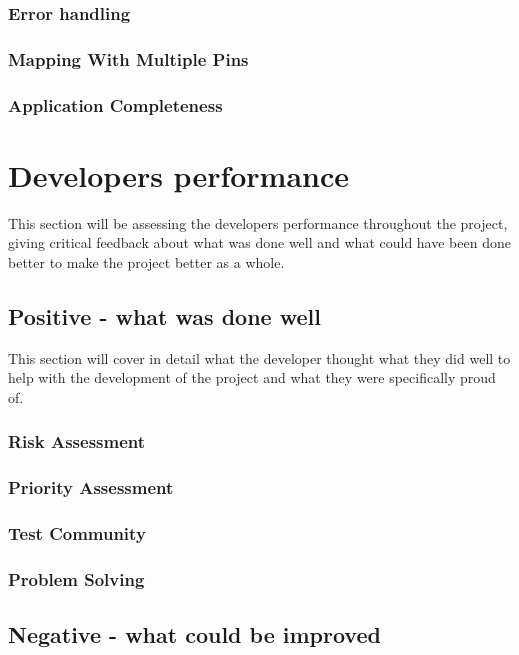 \subsubsection{Error handling}

\subsubsection{Mapping With Multiple Pins}

\subsubsection{Application Completeness}


\section{Developers performance}

This section will be assessing the developers performance throughout the project, giving critical feedback about what was done well and what could have been done better to make the project better as a whole.

\subsection{Positive - what was done well}

This section will cover in detail what the developer thought what they did well to help with the development of the project and what they were specifically proud of.

\subsubsection{Risk Assessment}

\subsubsection{Priority Assessment}

\subsubsection{Test Community}

\subsubsection{Problem Solving}


\subsection{Negative - what could be improved}

